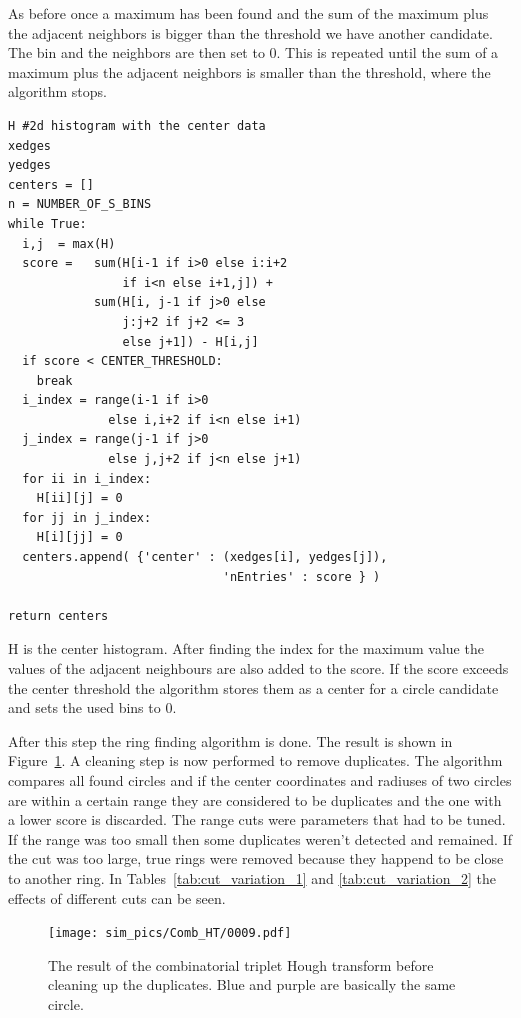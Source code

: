 \documentclass[11pt]{scrreprt}
\begin{document}
As before once a maximum has been found and the sum of the maximum plus the adjacent neighbors is bigger than the threshold we have another
candidate. The bin and the neighbors are then set to 0. This is repeated until the sum of a maximum plus the adjacent neighbors is smaller
than the threshold, where the algorithm stops.
\begin{codesnippet}
  \begin{lstlisting}
H #2d histogram with the center data
xedges 
yedges 
centers = []
n = NUMBER_OF_S_BINS
while True:
  i,j  = max(H)
  score =   sum(H[i-1 if i>0 else i:i+2 
                if i<n else i+1,j]) + 
            sum(H[i, j-1 if j>0 else
                j:j+2 if j+2 <= 3 
                else j+1]) - H[i,j]
  if score < CENTER_THRESHOLD:
    break
  i_index = range(i-1 if i>0 
              else i,i+2 if i<n else i+1)
  j_index = range(j-1 if j>0 
              else j,j+2 if j<n else j+1)
  for ii in i_index:
    H[ii][j] = 0  
  for jj in j_index:
    H[i][jj] = 0
  centers.append( {'center' : (xedges[i], yedges[j]), 
                              'nEntries' : score } )

return centers
\end{lstlisting}
\caption[Center coordinate extraction]{H is the center histogram. After finding the index for the maximum value the values of the 
adjacent neighbours are also added to the score. If the score exceeds the center threshold the algorithm stores them as a center for
a circle candidate and sets the used bins to 0.}
\end{codesnippet}


After this step the ring finding algorithm is done. The result is shown in Figure~\ref{fig:comb_ht_0009}. A cleaning step is now performed
to remove duplicates.
The algorithm compares all found circles and if the center coordinates and radiuses of two circles are within a certain range they 
are considered to be duplicates and the one with a lower score is discarded. The range cuts were parameters that had to be tuned. If the 
range was too small then some duplicates weren't detected and remained. If the cut was too large, true rings were removed because they
happend to be close to another ring. In Tables~\ref{tab:cut_variation_1} and \ref{tab:cut_variation_2} the effects of different
cuts can be seen.


\begin{figure}[htb]
  \centering
  \texttt{[image: sim\_pics/Comb\_HT/0009.pdf]}
  \caption{The result of the combinatorial triplet Hough transform before cleaning up the duplicates. Blue and purple are basically the same circle.}
  \label{fig:comb_ht_0009}
\end{figure}
\end{document}

